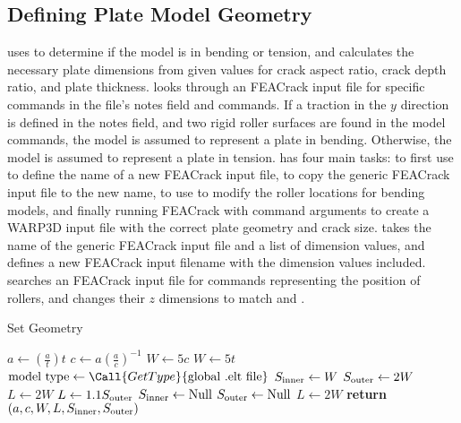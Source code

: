 \subsection{Defining Plate Model Geometry}

 uses  to determine if the model is in bending or tension, and calculates the necessary plate dimensions from given values for crack aspect ratio, crack depth ratio, and plate thickness.
 looks through an FEACrack input file for specific commands in the file's notes field and commands.
If a traction in the \(y\) direction is defined in the notes field, and two rigid roller surfaces are found in the model commands, the model is assumed to represent a plate in bending.
Otherwise, the model is assumed to represent a plate in tension.
 has four main tasks: to first use  to define the name of a new FEACrack input file, to copy the generic FEACrack input file to the new name, to use  to modify the roller locations for bending models, and finally running FEACrack with command arguments to create a WARP3D input file with the correct plate geometry and crack size.
 takes the name of the generic FEACrack input file and a list of dimension values, and defines a new FEACrack input filename with the dimension values included.
 searches an FEACrack input file for commands representing the position of rollers, and changes their \(z\) dimensions to match \Sinner and \Souter.
\begin{algorithm}[tbp]
  \caption{Set Geometry}
  \label{alg:set_geometry}
  \begin{algorithmic}
     
    \State $a \gets (\frac{a}{t})t$
    \State $c \gets a (\frac{a}{c})^{-1}$
      \State $W \gets 5c$
    \Else
      \State $W \gets 5t$
    \EndIf
    \State $\text{model type} \gets \Call{Get Type}{\text{global .elt file}}$
      \State $S_\textnormal{inner} \gets W$
      \State $S_\textnormal{outer} \gets 2W$
        \State $L \gets 2 W$
      \Else
        \State $L \gets 1.1 S_\textnormal{outer}$
      \EndIf
    \Else
      \State $S_\textnormal{inner} \gets \text{Null}$
      \State $S_\textnormal{outer} \gets \text{Null}$
      \State $L \gets 2 W$
    \EndIf
    \State \textbf{return} $(a, c, W, L, S_\textnormal{inner}, S_\textnormal{outer})$
    \EndProcedure
  \end{algorithmic}
\end{algorithm}

